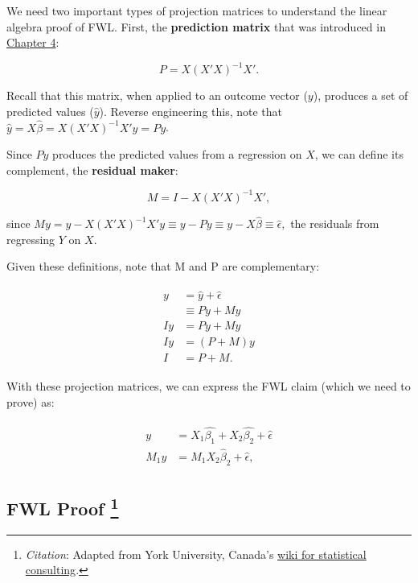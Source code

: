 \documentclass[
]{book}
\begin{document}
We need two important types of projection matrices to understand the linear algebra proof of FWL. First, the \textbf{prediction matrix} that was introduced in \protect\hyperlink{linear_projection}{Chapter 4}:

\begin{equation}
    P = X(X'X)^{-1}X'.
\end{equation}

Recall that this matrix, when applied to an outcome vector (\(y\)), produces a set of predicted values (\(\hat{y}\)). Reverse engineering this, note that \(\hat{y}=X\hat{\beta}=X(X'X)^{-1}X'y = Py\).

Since \(Py\) produces the predicted values from a regression on \(X\), we can define its complement, the \textbf{residual maker}:

\begin{equation}
    M = I - X(X'X)^{-1}X',
\end{equation}

since \(My = y - X(X'X)^{-1}X'y \equiv y-Py \equiv y - X\hat{\beta} \equiv \hat{\epsilon},\) the residuals from regressing \(Y\) on \(X\).

Given these definitions, note that M and P are complementary:

\begin{align}
\begin{aligned}
    y  &= \hat{y} + \hat{\epsilon} \\
       &\equiv Py + My \\ 
    Iy &= Py + My \\
    Iy &= (P + M)y \\
    I  &= P + M.
\end{aligned}
\end{align}

With these projection matrices, we can express the FWL claim (which we need to prove) as:

\begin{align}
\begin{aligned}
    y &= X_{1}\hat{\beta_{1}} + X_{2}\hat{\beta_{2}} + \hat{\epsilon} \\
    M_{1}y &= M_{1}X_2\hat{\beta}_{2} + \hat{\epsilon}, \label{projection_statement}
\end{aligned}
\end{align}

\hypertarget{fwl-proof-secnote2}{%
\subsection[FWL Proof ]{\texorpdfstring{FWL Proof \footnote{\emph{Citation}: Adapted from York University, Canada's \href{http://scs.math.yorku.ca/index.php/Statistics:_Frisch-Waugh-Lovell_and_GLS/Proof_of_the_FWL_for_OLS}{wiki for statistical consulting}.}}{FWL Proof }}\label{fwl-proof-secnote2}}
\end{document}
